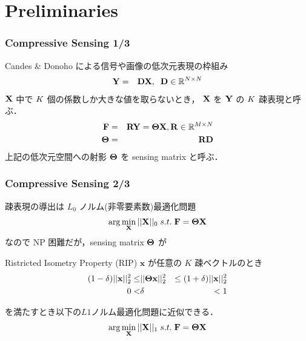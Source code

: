 \section{Preliminaries}

\begin{frame}\frametitle{Compressive Sensing 1/3}
Candes \& Donoho による信号や画像の低次元表現の枠組み
\begin{eqnarray}
    {\mathbf{Y}} & = & {\mathbf{D}} {\mathbf{X}}, \;\;
    {\mathbf{D}} \in {\mathbb{R}^{N\times N}}
\end{eqnarray}
${\mathbf{X}}$ 中で $K$ 個の係数しか大きな値を取らないとき，
${\mathbf{X}}$ を ${\mathbf{Y}}$ の $K$ 疎表現と呼ぶ．
\begin{eqnarray}
    {\mathbf{F}} & = & {\mathbf{R}} {\mathbf{Y}} = {\mathbf{\Theta}} {\mathbf{X}},
    {\mathbf{R}} \in {\mathbb{R}^{M\times N}} \\
    {\mathbf{\Theta}} & = & {\mathbf{R}} {\mathbf{D}}
\end{eqnarray}
上記の低次元空間への射影 ${\mathbf{\Theta}}$ を sensing matrix と呼ぶ．
\end{frame}


\begin{frame}\frametitle{Compressive Sensing 2/3}
疎表現の導出は $L_0$ ノルム(非零要素数)最適化問題
\begin{equation}
    \arg\min_{{\mathbf{X}}} ||{\mathbf{X}}||_0 \; s.t. \; {\mathbf{F}} = {\mathbf{\Theta}} {\mathbf{X}}
\end{equation}
なので NP 困難だが，sensing matrix ${\mathbf{\Theta}}$ が
\begin{block}{Ristricted Isometry Property (RIP)}
$\mathbf{x}$ が任意の $K$ 疎ベクトルのとき
\begin{eqnarray}
    (1 - \delta) ||\mathbf{x}||^2_2 \leq & || {\mathbf{\Theta}} \mathbf{x} 
    ||^2_2 & \leq (1 + \delta) ||\mathbf{x}||^2_2 \\
    0 < & \delta & < 1
\end{eqnarray}
\end{block}
を満たすとき以下の$L1$ノルム最適化問題に近似できる\cite{Candes2008}．
\begin{equation}
    \arg\min_{{\mathbf{X}}}  ||{\mathbf{X}}||_1 \; s.t. \; {\mathbf{F}} = {\mathbf{\Theta}} {\mathbf{X}}
\end{equation}
\end{frame}


